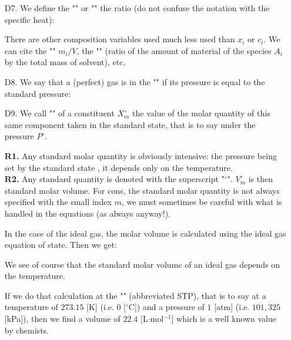 \begin{enumerate}
		\item[D7.] We define the "" or "" the ratio (do not confuse the notation with the specific heat):
		
		\begin{tcolorbox}[title=Remark,colframe=black,arc=10pt]
		There are other composition variables used much less used than $x_i$ or $c_i$. We can cite the "" $m_i/V$, the "" (ratio of the amount of material of the species $A_i$ by the total mass of solvent), etc.
		\end{tcolorbox}
		
		\item[D8.] We say that a (perfect) gas is in the "" if its pressure is equal to the standard pressure:
		
		
		\item[D9.] We call "" of a constituent $X_m^\circ$ the value of the molar quantity of this same component taken in the standard state, that is to say under the pressure $P^\circ$.
		\begin{tcolorbox}[title=Remarks,colframe=black,arc=10pt]
		\textbf{R1.} Any standard molar quantity is obviously intensive: the pressure being set by the standard state , it depends only on the temperature.\\
		
		\textbf{R2.} Any standard quantity is denoted with the superscript "${}^\circ$". $V_m^\circ$ is then standard molar volume. For cons, the standard molar quantity is not always specified with the small index $m$, we must sometimes be careful with what is handled in the equations (as always anyway!).
		\end{tcolorbox}	
		In the case of the ideal gas, the molar volume is calculated using the ideal gas equation of state. Then we get:
		
		We see of course that the standard molar volume of an ideal gas depends on the temperature.
		
		If we do that calculation at the "" (abbreviated STP), that is to say at a temperature of $273.15$ [K] (i.e. $0$ [$^\circ$C]) and a pressure of $1$ [atm] (i.e. $101,325$ [kPa]), then we find a volume of $22.4$ [L$\cdot$mol$^{-1}$] which is a well known value by chemists.
	\end{enumerate}
	
